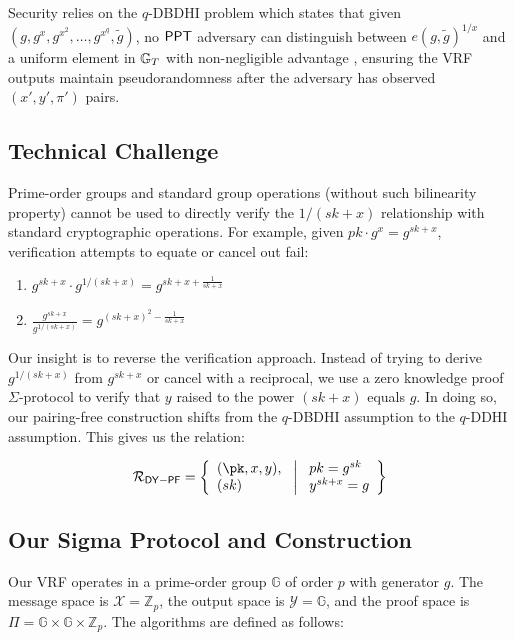 Security relies on the $q$-DBDHI problem which states that given $(g, g^x, g^{x^2}, \ldots, g^{x^q}, \tilde{g})$, no $\mathsf{PPT}$ adversary can distinguish between $e(g,\tilde{g})^{1/x}$ and a uniform element in $\mathbb{G}_T$ with non-negligible advantage , ensuring the VRF outputs maintain pseudorandomness after the adversary has observed $(x',y',\pi')$ pairs.

\subsection{Technical Challenge}

Prime-order groups and standard group operations (without such bilinearity property) cannot be used to directly verify the $1/(sk+x)$ relationship with standard cryptographic operations. For example, given $pk  \cdot g^x = g^{sk+x}$, verification attempts to equate or cancel out fail:

\begin{enumerate}
    \item $g^{sk+x} \cdot g^{1/(sk+x)} = g^{sk + x + \frac{1}{sk+x}}$
    \item $\frac{g^{sk+x}}{g^{1/(sk+x)}} = g^{(sk+x)^2-\frac{1}{sk+x}}$
\end{enumerate}

Our insight is to reverse the verification approach. Instead of trying to derive $g^{1/(sk+x)}$ from $g^{sk+x}$ or cancel with a reciprocal, we use a zero knowledge proof $\Sigma$-protocol to verify that $y$ raised to the power $(sk+x)$ equals $g$. In doing so, our pairing-free construction shifts from the $q$-DBDHI assumption to the $q$-DDHI assumption. This gives us the relation:

\[
\mathcal{R}_{\mathsf{DY-PF}} = \left\{ 
\begin{array}{l} 
(\pk, x, y),\\
(sk) 
\end{array}
\ \middle|
\ \begin{array}{l}
pk = g^{sk} \\
y^{sk + x} = g  \\
\end{array} \right\}
\]

\subsection{Our Sigma Protocol and Construction}\label{sec-dy-pf}

Our VRF operates in a prime-order group $\mathbb{G}$ of order $p$ with generator $g$. The message space is $\mathcal{X} = \mathbb{Z}_p$, the output space is $\mathcal{Y} = \mathbb{G}$, and the proof space is $\Pi = \mathbb{G} \times \mathbb{G} \times \mathbb{Z}_p$. The algorithms are defined as follows:


